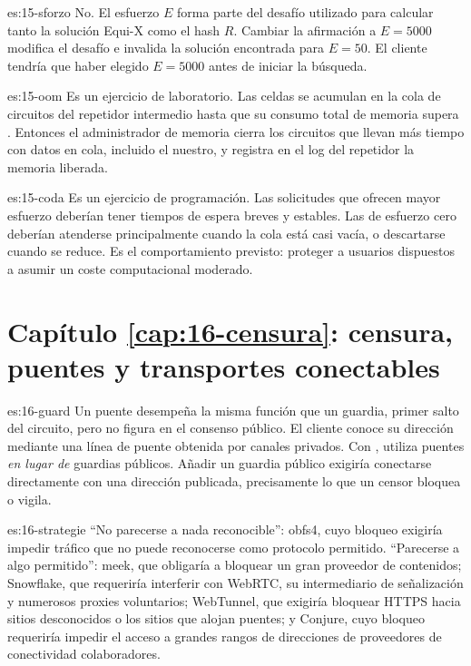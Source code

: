 \begin{soluzione}{es:15-sforzo}
No. El esfuerzo $E$ forma parte del desafío utilizado para calcular tanto la solución Equi-X como el hash $R$. Cambiar la afirmación a $E=5000$ modifica el desafío e invalida la solución encontrada para $E=50$. El cliente tendría que haber elegido $E=5000$ antes de iniciar la búsqueda.
\end{soluzione}

\begin{soluzione}{es:15-oom}
Es un ejercicio de laboratorio. Las celdas se acumulan en la cola de circuitos del repetidor intermedio hasta que su consumo total de memoria supera . Entonces el administrador de memoria cierra los circuitos que llevan más tiempo con datos en cola, incluido el nuestro, y registra en el log del repetidor la memoria liberada.
\end{soluzione}

\begin{soluzione}{es:15-coda}
Es un ejercicio de programación. Las solicitudes que ofrecen mayor esfuerzo deberían tener tiempos de espera breves y estables. Las de esfuerzo cero deberían atenderse principalmente cuando la cola está casi vacía, o descartarse cuando se reduce. Es el comportamiento previsto: proteger a usuarios dispuestos a asumir un coste computacional moderado.
\end{soluzione}

\section*{Capítulo \ref{cap:16-censura}: censura, puentes y transportes conectables}

\begin{soluzione}{es:16-guard}
Un puente desempeña la misma función que un guardia, primer salto del circuito, pero no figura en el consenso público. El cliente conoce su dirección mediante una línea de puente obtenida por canales privados. Con , utiliza puentes \emph{en lugar de} guardias públicos. Añadir un guardia público exigiría conectarse directamente con una dirección publicada, precisamente lo que un censor bloquea o vigila.
\end{soluzione}

\begin{soluzione}{es:16-strategie}
\enquote{No parecerse a nada reconocible}: obfs4, cuyo bloqueo exigiría impedir tráfico que no puede reconocerse como protocolo permitido. \enquote{Parecerse a algo permitido}: meek, que obligaría a bloquear un gran proveedor de contenidos; Snowflake, que requeriría interferir con WebRTC, su intermediario de señalización y numerosos proxies voluntarios; WebTunnel, que exigiría bloquear HTTPS hacia sitios desconocidos o los sitios que alojan puentes; y Conjure, cuyo bloqueo requeriría impedir el acceso a grandes rangos de direcciones de proveedores de conectividad colaboradores.
\end{soluzione}

